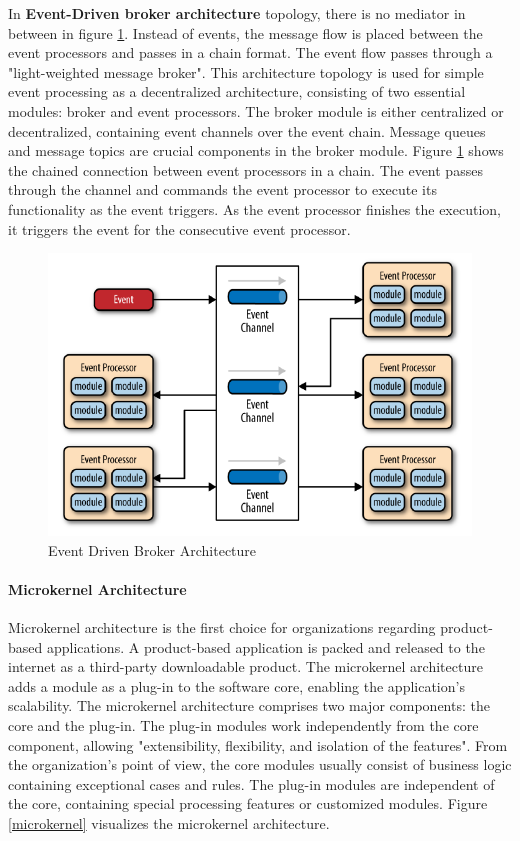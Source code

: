 \documentclass[12pt,a4paper]{article}
\begin{document}
In \textbf{Event-Driven broker architecture} topology, there is no mediator in between in figure \ref{broker_event_driven}. Instead of events, the message flow is placed between the event processors and passes in a chain format. The event flow passes through a "light-weighted message broker". This architecture topology is used for simple event processing as a decentralized architecture,  consisting of two essential modules: broker and event processors. The broker module is either centralized or decentralized, containing event channels over the event chain. Message queues and message topics are crucial components in the broker module. Figure \ref{broker_event_driven} shows the chained connection between event processors in a chain. The event passes through the channel and commands the event processor to execute its functionality as the event triggers. As the event processor finishes the execution, it triggers the event for the consecutive event processor. \cite{r18}

\begin{figure}[H]
\centering
\includegraphics[scale=0.75]{broker_event_driven.PNG}
\caption{Event Driven Broker Architecture \cite{r18}}
\label{broker_event_driven}
\end{figure}


\paragraph{Microkernel Architecture}

Microkernel architecture is the first choice for organizations regarding product-based applications. A product-based application is packed and released to the internet as a third-party downloadable product. The microkernel architecture adds a module as a plug-in to the software core, enabling the application's scalability. The microkernel architecture comprises two major components: the core and the plug-in. The plug-in modules work independently from the core component, allowing "extensibility, flexibility, and isolation of the features". From the organization's point of view, the core modules usually consist of business logic containing exceptional cases and rules. The plug-in modules are independent of the core, containing special processing features or customized modules. Figure \ref{microkernel} visualizes the microkernel architecture. \cite{r18}
\end{document}
